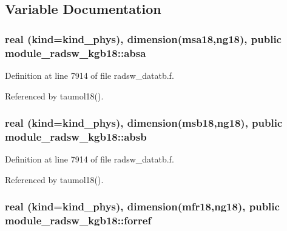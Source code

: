 \subsection{Variable Documentation}
\subsubsection[{\texorpdfstring{absa}{absa}}]{\setlength{\rightskip}{0pt plus 5cm}real (kind=kind\+\_\+phys), dimension({\bf msa18},ng18), public module\+\_\+radsw\+\_\+kgb18\+::absa}\hypertarget{namespacemodule__radsw__kgb18_a8a7787776bd057b1815e92a5f58b9cac}{}\label{namespacemodule__radsw__kgb18_a8a7787776bd057b1815e92a5f58b9cac}


Definition at line 7914 of file radsw\+\_\+datatb.\+f.



Referenced by taumol18().

\subsubsection[{\texorpdfstring{absb}{absb}}]{\setlength{\rightskip}{0pt plus 5cm}real (kind=kind\+\_\+phys), dimension({\bf msb18},ng18), public module\+\_\+radsw\+\_\+kgb18\+::absb}\hypertarget{namespacemodule__radsw__kgb18_a858680db0ee5e9a599639844a91f8f06}{}\label{namespacemodule__radsw__kgb18_a858680db0ee5e9a599639844a91f8f06}


Definition at line 7914 of file radsw\+\_\+datatb.\+f.



Referenced by taumol18().

\subsubsection[{\texorpdfstring{forref}{forref}}]{\setlength{\rightskip}{0pt plus 5cm}real (kind=kind\+\_\+phys), dimension({\bf mfr18},ng18), public module\+\_\+radsw\+\_\+kgb18\+::forref}\hypertarget{namespacemodule__radsw__kgb18_a0efc293c91de3d17b29ed713ff09d7a9}{}\label{namespacemodule__radsw__kgb18_a0efc293c91de3d17b29ed713ff09d7a9}


